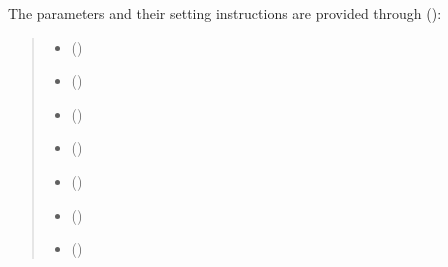 \documentclass[letterpaper,10pt,english]{sphinxmanual}
\begin{document}
The parameters and their setting instructions
are provided through {\hyperref[\detokenize{input_files/CBL_input/CBLinput:cblinput}]{}} ():
\begin{quote}
\begin{itemize}\setlength{\itemsep}{0pt}\setlength{\parskip}{0pt}
\item {} 
{\hyperref[\detokenize{input_files/CBL_input/CBLinput:cmdoption-arg-entrainmenttype}]{}} ()

\item {} 
{\hyperref[\detokenize{input_files/CBL_input/CBLinput:cmdoption-arg-qh-choice}]{}} ()

\item {} 
{\hyperref[\detokenize{input_files/CBL_input/CBLinput:cmdoption-arg-initialdata-use}]{}} ()

\item {} 
{\hyperref[\detokenize{input_files/CBL_input/CBLinput:cmdoption-arg-sondeflag}]{}} ()

\item {} 
{\hyperref[\detokenize{input_files/CBL_input/CBLinput:cmdoption-arg-cblday-id}]{}} ()

\item {} 
{\hyperref[\detokenize{input_files/CBL_input/CBLinput:cmdoption-arg-co2-included}]{}} ()

\item {} 
{\hyperref[\detokenize{input_files/CBL_input/CBLinput:cmdoption-arg-filesonde-id}]{}} ()


\end{itemize}
\end{quote}
\end{document}
